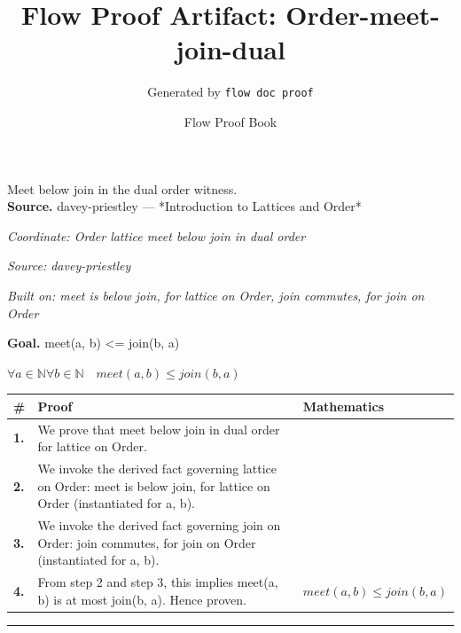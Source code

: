 \documentclass[11pt]{article}
\title{Flow Proof Artifact: Order-meet-join-dual}
\author{Generated by \texttt{flow doc proof}}
\date{Flow Proof Book}
\theoremstyle{definition}
\begin{document}
\maketitle
Meet below join in the dual order witness.\\[0.5em]
\textbf{Source.} davey-priestley — *Introduction to Lattices and Order*\\[0.5em]
\bigskip
{}\par
\smallskip\noindent\textit{Coordinate: Order \cdot lattice \cdot meet below join in dual order}\par
\smallskip\noindent\textit{Source: davey-priestley}\par
\smallskip\noindent\textit{Built on: meet is below join, for lattice on Order, join commutes, for join on Order}\par
\medskip
\noindent\textbf{Goal.} meet(a, b) <= join(b, a)\par
\noindent$\displaystyle \forall a \in \mathbb{N} \forall b \in \mathbb{N}\quad meet(a, b) \le join(b, a)$\par
\medskip
\noindent
\begin{tabular}{@{} >{\raggedright\arraybackslash}p{} >{\raggedright\arraybackslash}p{} >{\raggedleft\arraybackslash}p{} @{}}
\textbf{\#} & \textbf{Proof} & \textbf{Mathematics} \\
\midrule
\textbf{1.} & We prove that meet below join in dual order for lattice on Order. & \\[0.45em]
\textbf{2.} & We invoke the derived fact governing lattice on Order: meet is below join, for lattice on Order (instantiated for a, b). & \\[0.45em]
\textbf{3.} & We invoke the derived fact governing join on Order: join commutes, for join on Order (instantiated for a, b). & \\[0.45em]
\textbf{4.} & From step 2 and step 3, this implies meet(a, b) is at most join(b, a). Hence proven. & $\displaystyle meet(a, b) \le join(b, a)$ \\[0.45em]
\bottomrule
\end{tabular}
\label{thm:Order-lattice-meet_below_join_in_dual_order}
\par\medskip\hrule
\end{document}

